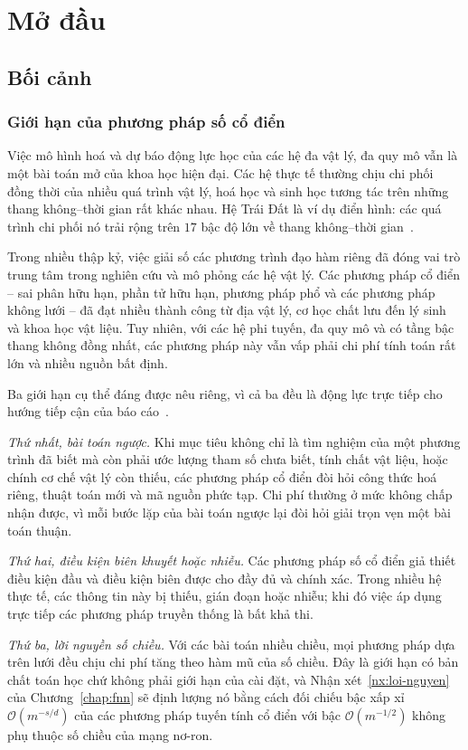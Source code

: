 \chapter{Mở đầu}
\label{chap:modau}
\section{Bối cảnh}
\label{sec:boi-canh}
\subsection{Giới hạn của phương pháp số cổ điển}
\label{subsec:gioi-han-co-dien}
Việc mô hình hoá và dự báo động lực học của các hệ đa vật lý, đa quy mô vẫn là
một bài toán mở của khoa học hiện đại. Các hệ thực tế thường chịu chi phối đồng
thời của nhiều quá trình vật lý, hoá học và sinh học tương tác trên những thang
không--thời gian rất khác nhau. Hệ Trái Đất là ví dụ điển hình: các quá trình chi
phối nó trải rộng trên $17$ bậc độ lớn về thang không--thời
gian~\cite{karniadakis2021}.
 
Trong nhiều thập kỷ, việc giải số các phương trình đạo hàm riêng đã đóng vai trò
trung tâm trong nghiên cứu và mô phỏng các hệ vật lý. Các phương pháp cổ điển --
sai phân hữu hạn, phần tử hữu hạn, phương pháp phổ và các phương pháp không lưới
-- đã đạt nhiều thành công từ địa vật lý, cơ học chất lưu đến lý sinh và khoa học
vật liệu. Tuy nhiên, với các hệ phi tuyến, đa quy mô và có tầng bậc thang không
đồng nhất, các phương pháp này vẫn vấp phải chi phí tính toán rất lớn và nhiều
nguồn bất định.
 
Ba giới hạn cụ thể đáng được nêu riêng, vì cả ba đều là động lực trực tiếp cho
hướng tiếp cận của báo cáo~\cite{karniadakis2021}.
 
\emph{Thứ nhất, bài toán ngược.} Khi mục tiêu không chỉ là tìm nghiệm của một
phương trình đã biết mà còn phải ước lượng tham số chưa biết, tính chất vật liệu,
hoặc chính cơ chế vật lý còn thiếu, các phương pháp cổ điển đòi hỏi công thức hoá
riêng, thuật toán mới và mã nguồn phức tạp. Chi phí thường ở mức không chấp nhận
được, vì mỗi bước lặp của bài toán ngược lại đòi hỏi giải trọn vẹn một bài toán
thuận.
 
\emph{Thứ hai, điều kiện biên khuyết hoặc nhiễu.} Các phương pháp số cổ điển giả
thiết điều kiện đầu và điều kiện biên được cho đầy đủ và chính xác. Trong nhiều
hệ thực tế, các thông tin này bị thiếu, gián đoạn hoặc nhiễu; khi đó việc áp dụng
trực tiếp các phương pháp truyền thống là bất khả thi.
 
\emph{Thứ ba, lời nguyền số chiều.} Với các bài toán nhiều chiều, mọi phương pháp
dựa trên lưới đều chịu chi phí tăng theo hàm mũ của số chiều. Đây là giới hạn có
bản chất toán học chứ không phải giới hạn của cài đặt, và
Nhận xét~\ref{nx:loi-nguyen} của Chương~\ref{chap:fnn} sẽ định lượng nó bằng cách
đối chiếu bậc xấp xỉ $\mathcal{O}(m^{-s/d})$ của các phương pháp tuyến tính cổ
điển với bậc $\mathcal{O}(m^{-1/2})$ không phụ thuộc số chiều của mạng nơ-ron.
 
